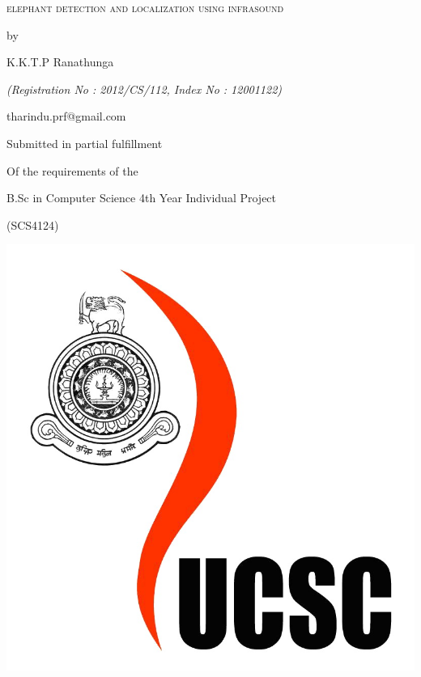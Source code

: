 \documentclass[11pt]{article}
\numberwithin{figure}{section}
\numberwithin{table}{section}
\renewcommand{\baselinestretch}{1.5}
\begin{document}
 

\begin{titlepage}
	
	\centering
	\renewcommand{\baselinestretch}{1.7}\normalsize
	
	{\fontsize{1cm}{1.2em}\selectfont \scshape elephant detection and localization using infrasound}
	
	\vspace*{2\baselineskip}	
		
	\renewcommand{\baselinestretch}{1.25}\normalsize
	
	\vspace*{2\baselineskip}
	
	{by}
	
	\vspace*{0.3\baselineskip}
	{\Large K.K.T.P Ranathunga}
	\vspace*{0.3\baselineskip}
	
	{\itshape (Registration No : 2012/CS/112, Index No : 12001122)}
	
	{\normalsize tharindu.prf@gmail.com}
	
	\vspace*{2\baselineskip}
	
	\normalsize  {{Submitted in partial fulfillment}
		
		{Of the requirements of the}
		
		{B.Sc in Computer Science 4th Year Individual Project}
		
		{(SCS4124)}}
	
	\vspace*{2\baselineskip}
	
	\includegraphics[scale=0.1]{ucsc.png}
	

\end{titlepage}
\end{document}
